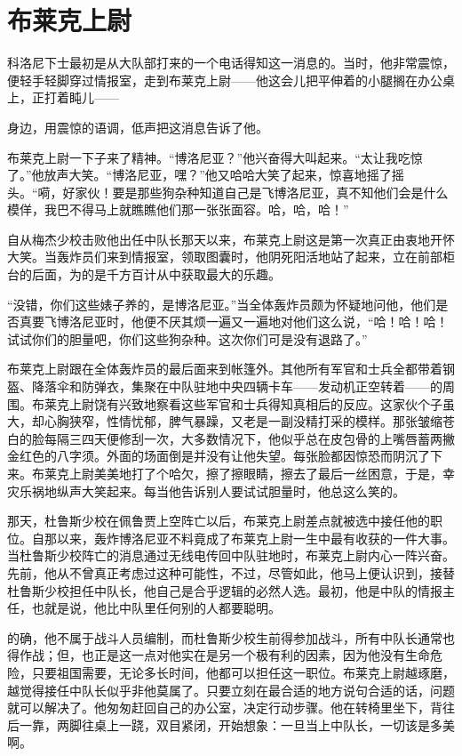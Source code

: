 \chapter{布莱克上尉}
 
    科洛尼下士最初是从大队部打来的一个电话得知这一消息的。当时，他非常震惊，便轻手轻脚穿过情报室，走到布莱克上尉——他这会儿把平伸着的小腿搁在办公桌上，正打着盹儿——

    身边，用震惊的语调，低声把这消息告诉了他。

    布莱克上尉一下子来了精神。“博洛尼亚？”他兴奋得大叫起来。“太让我吃惊了。”他放声大笑。“博洛尼亚，嘿？”他又哈哈大笑了起来，惊喜地摇了摇头。“嗬，好家伙！要是那些狗杂种知道自己是飞博洛尼亚，真不知他们会是什么模佯，我巴不得马上就瞧瞧他们那一张张面容。哈，哈，哈！”

    自从梅杰少校击败他出任中队长那天以来，布莱克上尉这是第一次真正由衷地开怀大笑。当轰炸员们来到情报室，领取图囊时，他阴死阳活地站了起来，立在前部柜台的后面，为的是千方百计从中获取最大的乐趣。

    “没错，你们这些婊子养的，是博洛尼亚。”当全体轰炸员颇为怀疑地问他，他们是否真要飞博洛尼亚时，他便不厌其烦一遍又一遍地对他们这么说，“哈！哈！哈！试试你们的胆量吧，你们这些狗杂种。这次你们可是没有退路了。”

    布莱克上尉跟在全体轰炸员的最后面来到帐篷外。其他所有军官和士兵全都带着钢盔、降落伞和防弹衣，集聚在中队驻地中央四辆卡车——发动机正空转着——的周围。布莱克上尉饶有兴致地察看这些军官和士兵得知真相后的反应。这家伙个子虽大，却心胸狭窄，性情忧郁，脾气暴躁，又老是一副没精打采的模样。那张皱缩苍白的脸每隔三四天便修刮一次，大多数情况下，他似乎总在皮包骨的上嘴唇蓄两撇金红色的八字须。外面的场面倒是并没有让他失望。每张脸都因惊恐而阴沉了下来。布莱克上尉美美地打了个哈欠，擦了擦眼睛，擦去了最后一丝困意，于是，幸灾乐祸地纵声大笑起来。每当他告诉别人要试试胆量时，他总这么笑的。

    那天，杜鲁斯少校在佩鲁贾上空阵亡以后，布莱克上尉差点就被选中接任他的职位。自那以来，轰炸博洛尼亚不料竟成了布莱克上尉一生中最有收获的一件大事。当杜鲁斯少校阵亡的消息通过无线电传回中队驻地时，布莱克上尉内心一阵兴奋。先前，他从不曾真正考虑过这种可能性，不过，尽管如此，他马上便认识到，接替杜鲁斯少校担任中队长，他自己是合乎逻辑的必然人选。最初，他是中队的情报主任，也就是说，他比中队里任何别的人都要聪明。

 


    的确，他不属于战斗人员编制，而杜鲁斯少校生前得参加战斗，所有中队长通常也得作战；但，也正是这一点对他实在是另一个极有利的因素，因为他没有生命危险，只要祖国需要，无论多长时间，他都可以担任这一职位。布莱克上尉越琢磨，越觉得接任中队长似乎非他莫属了。只要立刻在最合适的地方说句合适的话，问题就可以解决了。他匆匆赶回自己的办公室，决定行动步骤。他在转椅里坐下，背往后一靠，两脚往桌上一跷，双目紧闭，开始想象：一旦当上中队长，一切该是多美啊。


